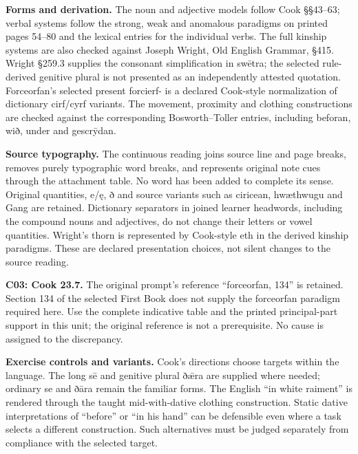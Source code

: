 \textbf{Forms and derivation.} The noun and adjective models follow Cook §§43–63; verbal systems follow the strong, weak and anomalous paradigms on printed pages 54–80 and the lexical entries for the individual verbs. The full kinship systems are also checked against Joseph Wright, Old English Grammar, §415. Wright §259.3 supplies the consonant simplification in swētra; the selected rule-derived genitive plural is not presented as an independently attested quotation. Forceorfan’s selected present forcierf- is a declared Cook-style normalization of dictionary cirf/\allowbreak{}cyrf variants. The movement, proximity and clothing constructions are checked against the corresponding Bosworth–Toller entries, including beforan, wið, under and gescrȳdan.

\textbf{Source typography.} The continuous reading joins source line and page breaks, removes purely typographic word breaks, and represents original note cues through the attachment table. No word has been added to complete its sense. Original quantities, e/\allowbreak{}ę, ð and source variants such as ciricean, hwæthwugu and Gang are retained. Dictionary separators in joined learner headwords, including the compound nouns and adjectives, do not change their letters or vowel quantities. Wright’s thorn is represented by Cook-style eth in the derived kinship paradigms. These are declared presentation choices, not silent changes to the source reading.

\textbf{C03: Cook 23.7.} The original prompt’s reference “forceorfan, 134” is retained. Section 134 of the selected First Book does not supply the forceorfan paradigm required here. Use the complete indicative table and the printed principal-part support in this unit; the original reference is not a prerequisite. No cause is assigned to the discrepancy.

\textbf{Exercise controls and variants.} Cook’s directions choose targets within the language. The long sē and genitive plural ðǣra are supplied where needed; ordinary se and ðāra remain the familiar forms. The English “in white raiment” is rendered through the taught mid-with-dative clothing construction. Static dative interpretations of “before” or “in his hand” can be defensible even where a task selects a different construction. Such alternatives must be judged separately from compliance with the selected target.

\endgroup

\par\label{end-ch13-learner}
\clearpage\endgroup
